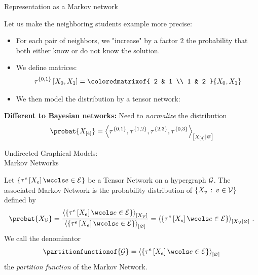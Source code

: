 \documentclass{beamer}
\begin{document}
    \begin{frame}{Representation as a Markov network}

        Let us make the neighboring students example more precise:
        \begin{itemize}
            \item For each pair of neighbors, we "increase" by a factor $2$ the probability that both either know or do not know the solution.
            \item We define matrices:
            \begin{align*}
                \hypercoreofat{\{0,1\}}{\catvariableof{0},\catvariableof{1}}
                =
                \coloredmatrixof{
                    2 & 1 \\ 1 & 2
                }{\catvariableof{0},\catvariableof{1}}
            \end{align*}
            \item We then model the distribution by a tensor network:
            
        \end{itemize}

            {\bf Different to Bayesian networks:} Need to \emph{normalize} the distribution
        \begin{align*}
            \probat{\catvariableof{[4]}}
            = \normalizationof{
                \hypercoreof{\{0,1\}},%
                \hypercoreof{\{1,2\}},%
                \hypercoreof{\{2,3\}},%
                \hypercoreof{\{0,3\}}%
            }{\catvariableof{[4]}}
        \end{align*}
    \end{frame}

    \begin{frame}{Undirected Graphical Models:\\
    Markov Networks}


        \begin{definition}
	Let $\{\hypercoreofat{\edge}{\catvariableof{\edge}} \wcols \edgein\}$ be a Tensor Network on a hypergraph $\mathcal{G}$.
    The associated Markov Network is the probability distribution of $\{X_{v}\,:\,v\in\mathcal{V}\}$ defined by
    \[ \probat{\nodevariables} = \frac{
        \contractionof{\{\hypercoreofat{\edge}{\catvariableof{\edge}} \wcols \edgein\}}{\nodevariables}
    }{
        \contractionof{\{\hypercoreofat{\edge}{\catvariableof{\edge}} \wcols \edgein\}}{\varnothing}
    } = \normalizationofwrt{\{\hypercoreofat{\edge}{\catvariableof{\edge}} \wcols \edgein\}}{\nodevariables}{\varnothing} \, . \]
    We call the denominator
    \[\partitionfunctionof{\graph} = \contractionof{\{\hypercoreofat{\edge}{\catvariableof{\edge}} \wcols \edgein\}}{\varnothing} \]
    the \emph{partition function} of the Markov Network.
        \end{definition}

    \end{frame}
\end{document}

